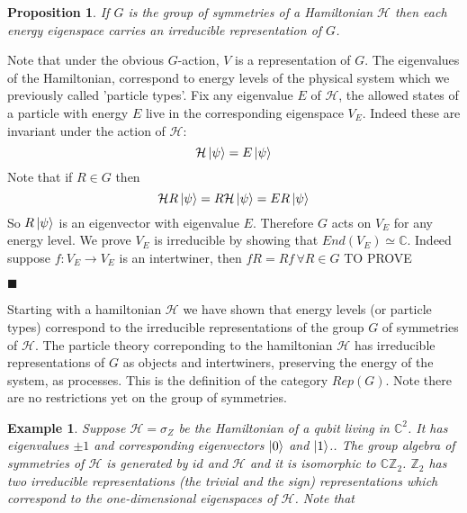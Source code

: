 \documentclass{article}
\newtheorem{example}{Example}
\newtheorem{proposition}[theorem]{Proposition}
\newenvironment{proof}[1][Proof]{\begin{trivlist}
\item[\hskip \labelsep {\bfseries #1}]}{\begin{flushright}$\blacksquare$\end{flushright} \end{trivlist}}
\newcommand{\ham}{\mathcal{H}}
\begin{document}
\begin{proposition}
If $G$ is the group of symmetries of a Hamiltonian $\mathcal{H}$ then each energy eigenspace carries an irreducible representation of $G$.
\end{proposition}
\begin{proof}
Note that under the obvious $G$-action, $V$ is a representation of $G$. 
The eigenvalues of the Hamiltonian, correspond to energy levels of the physical system which we previously called 'particle types'. Fix any eigenvalue $E$ of $\ham$, the allowed states of a particle with energy $E$ live in the corresponding eigenspace $V_E$. Indeed these are invariant under the action of $\ham$:
$$ \ham \ket{\psi}= E\ket{\psi}$$
Note that if $R\in G$ then
$$ \ham R \ket{\psi}=R\ham \ket{\psi}=ER\ket{\psi}$$
So $R\ket{\psi}$ is an eigenvector with eigenvalue $E$. Therefore $G$ acts on $V_E$ for any energy level.
We prove $V_E$ is irreducible by showing that $End(V_E) \simeq \mathbb{C}$. Indeed suppose $f:V_E \rightarrow V_E$ is an intertwiner, then $fR=Rf \, \forall R \in G$
TO PROVE
\end{proof}
Starting with a hamiltonian $\ham$ we have shown that energy levels (or particle types) correspond to the irreducible representations of the group $G$ of symmetries of $\ham$. The particle theory correponding to the hamiltonian $\ham$ has irreducible representations of $G$ as objects and intertwiners, preserving the energy of the system, as processes. This is the definition of the category $Rep(G)$. Note there are no restrictions yet on the group of symmetries.
\begin{example}
Suppose $\ham = \sigma_Z$ be the Hamiltonian of a qubit living in $\mathbb{C}^2$. It has eigenvalues $\pm1$ and corresponding eigenvectors $\ket{0}$ and $\ket{1}$.. The group algebra of symmetries of $\ham$ is generated by $id$ and $\ham$ and it is isomorphic to $\mathbb{C}\mathbb{Z}_2$. $\mathbb{Z}_2$ has two irreducible representations (the trivial and the sign) representations which correspond to the one-dimensional eigenspaces of $\ham$. Note that 
\end{example}

\end{document}
